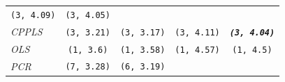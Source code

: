 \documentclass[num-refs]{wiley-article}
\begin{document}
\begin{longtable}[]{@{}lcccc@{}}
\begin{minipage}[t]{0.19\columnwidth}
\texttt{(3,\ 4.09)}\strut
\end{minipage} & \begin{minipage}[t]{0.19\columnwidth}\centering\strut
\texttt{(3,\ 4.05)}\strut
\end{minipage}\tabularnewline
\begin{minipage}[t]{0.09\columnwidth}\raggedright\strut
\emph{CPPLS}\strut
\end{minipage} & \begin{minipage}[t]{0.19\columnwidth}\centering\strut
\texttt{(3,\ 3.21)}\strut
\end{minipage} & \begin{minipage}[t]{0.19\columnwidth}\centering\strut
\texttt{(3,\ 3.17)}\strut
\end{minipage} & \begin{minipage}[t]{0.19\columnwidth}\centering\strut
\texttt{(3,\ 4.11)}\strut
\end{minipage} & \begin{minipage}[t]{0.19\columnwidth}\centering\strut
\textbf{\emph{\texttt{(3,\ 4.04)}}}\strut
\end{minipage}\tabularnewline
\begin{minipage}[t]{0.09\columnwidth}\raggedright\strut
\emph{OLS}\strut
\end{minipage} & \begin{minipage}[t]{0.19\columnwidth}\centering\strut
\texttt{(1,\ 3.6)}\strut
\end{minipage} & \begin{minipage}[t]{0.19\columnwidth}\centering\strut
\texttt{(1,\ 3.58)}\strut
\end{minipage} & \begin{minipage}[t]{0.19\columnwidth}\centering\strut
\texttt{(1,\ 4.57)}\strut
\end{minipage} & \begin{minipage}[t]{0.19\columnwidth}\centering\strut
\texttt{(1,\ 4.5)}\strut
\end{minipage}\tabularnewline
\begin{minipage}[t]{0.09\columnwidth}\raggedright\strut
\emph{PCR}\strut
\end{minipage} & \begin{minipage}[t]{0.19\columnwidth}\centering\strut
\texttt{(7,\ 3.28)}\strut
\end{minipage} & \begin{minipage}[t]{0.19\columnwidth}\centering\strut
\texttt{(6,\ 3.19)}\strut
\end{minipage} & \begin{minipage}[t]{0.19\columnwidth}\centering\strut

\end{minipage}
\end{longtable}
\end{document}
